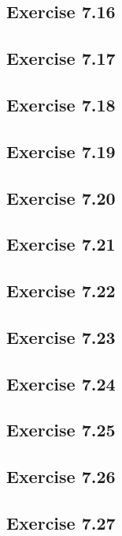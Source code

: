 \documentclass[../A&M.tex]{subfiles}
\begin{document}
\subsection*{Exercise 7.16}

\subsection*{Exercise 7.17}

\subsection*{Exercise 7.18}

\subsection*{Exercise 7.19}

\subsection*{Exercise 7.20}

\subsection*{Exercise 7.21}

\subsection*{Exercise 7.22}

\subsection*{Exercise 7.23}

\subsection*{Exercise 7.24}

\subsection*{Exercise 7.25}

\subsection*{Exercise 7.26}

\subsection*{Exercise 7.27}
\phantom{}
\end{document}
